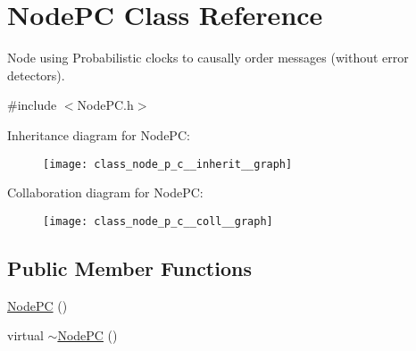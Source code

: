 \hypertarget{class_node_p_c}{}\section{Node\+PC Class Reference}
\label{class_node_p_c}


Node using Probabilistic clocks to causally order messages (without error detectors).  




{\ttfamily \#include $<$Node\+P\+C.\+h$>$}



Inheritance diagram for Node\+PC\+:\nopagebreak
\begin{figure}[H]
\begin{center}
\leavevmode
\texttt{[image: class\_node\_p\_c\_\_inherit\_\_graph]}
\end{center}
\end{figure}


Collaboration diagram for Node\+PC\+:\nopagebreak
\begin{figure}[H]
\begin{center}
\leavevmode
\texttt{[image: class\_node\_p\_c\_\_coll\_\_graph]}
\end{center}
\end{figure}
\subsection*{Public Member Functions}
\begin{DoxyCompactItemize}
\item 
\hyperlink{class_node_p_c_a0b937d3f3d409fd1a8d1c15170d97675}{Node\+PC} ()
\item 
virtual \hyperlink{class_node_p_c_a823ec7244202157115f6d587c0c565dc}{$\sim$\+Node\+PC} ()
\end{DoxyCompactItemize}
